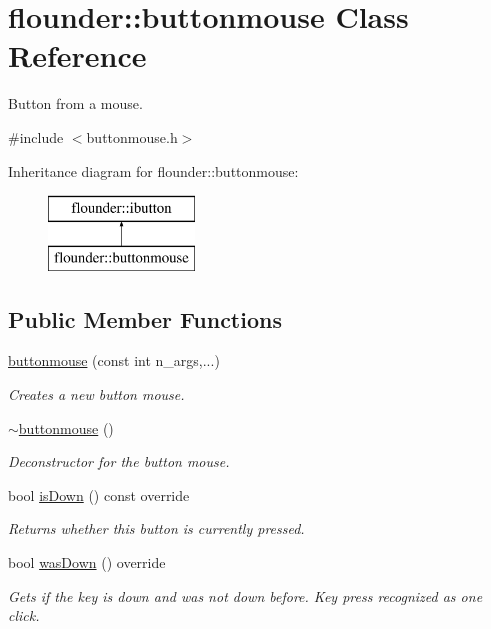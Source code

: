 \hypertarget{classflounder_1_1buttonmouse}{}\section{flounder\+:\+:buttonmouse Class Reference}
\label{classflounder_1_1buttonmouse}


Button from a mouse.  




{\ttfamily \#include $<$buttonmouse.\+h$>$}

Inheritance diagram for flounder\+:\+:buttonmouse\+:\begin{figure}[H]
\begin{center}
\leavevmode
\includegraphics[height=2.000000cm]{classflounder_1_1buttonmouse}
\end{center}
\end{figure}
\subsection*{Public Member Functions}
\begin{DoxyCompactItemize}
\item 
\hyperlink{classflounder_1_1buttonmouse_a6721eb42c25bc50c2a4db56ca27c4cda}{buttonmouse} (const int n\+\_\+args,...)
\begin{DoxyCompactList}\small\item\em Creates a new button mouse. \end{DoxyCompactList}\item 
\hyperlink{classflounder_1_1buttonmouse_aa967f7f977040b0f4a58dc10d4414e75}{$\sim$buttonmouse} ()
\begin{DoxyCompactList}\small\item\em Deconstructor for the button mouse. \end{DoxyCompactList}\item 
bool \hyperlink{classflounder_1_1buttonmouse_ad4f5435d1141e54169c96a4ff8ea8ab7}{is\+Down} () const override
\begin{DoxyCompactList}\small\item\em Returns whether this button is currently pressed. \end{DoxyCompactList}\item 
bool \hyperlink{classflounder_1_1buttonmouse_a7dad01481ebb01755db054a0acbc8159}{was\+Down} () override
\begin{DoxyCompactList}\small\item\em Gets if the key is down and was not down before. Key press recognized as one click. \end{DoxyCompactList}\end{DoxyCompactItemize}
